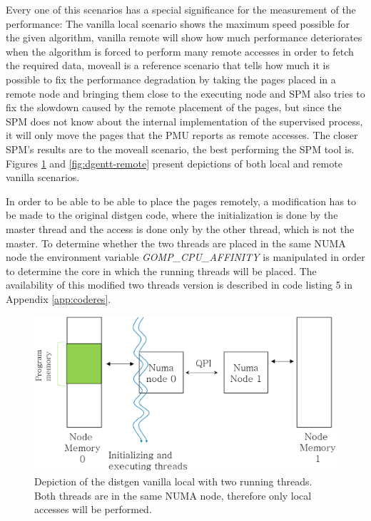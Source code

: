 Every one of this scenarios has a special significance for the measurement of the performance: The vanilla local scenario shows the maximum speed possible for the given algorithm, vanilla remote will show how much performance deteriorates when the algorithm is forced to perform many remote accesses in order to fetch the required data, moveall is a reference scenario that tells how much it is possible to fix the performance degradation by taking the pages placed in a remote node and bringing them close to the executing node and SPM also tries to fix the slowdown caused by the remote placement of the pages, but since the SPM does not know about the internal implementation of the supervised process, it will only move the pages that the PMU reports as remote accesses. The closer SPM's results are to the moveall scenario, the best performing the SPM tool is. Figures \ref{fig:dgentt-local} and \ref{fig:dgentt-remote} present depictions of both local and remote vanilla scenarios.

In order to be able to be able to place the pages remotely, a modification has to be made to the original distgen code, where the initialization is done by the master thread and the access is done only by the other thread, which is not the master. To determine whether the two threads are placed in the same NUMA node the environment variable \textit{GOMP\_CPU\_AFFINITY} is manipulated in order to determine the core in which the running threads will be placed. The availability of this modified two threads version is described in code listing 5 in Appendix \ref{app:coderes}.

\begin{figure}
	\centering
		\includegraphics[width=.7\textwidth]{figures/distgentt-local.eps}
		\caption[Depiction of the working of the distgen vanilla local scenario with two threads]{Depiction of the distgen vanilla local with two running threads. Both threads are in the same NUMA node, therefore only local accesses will be performed.}
		\label{fig:dgentt-local}
\end{figure}

